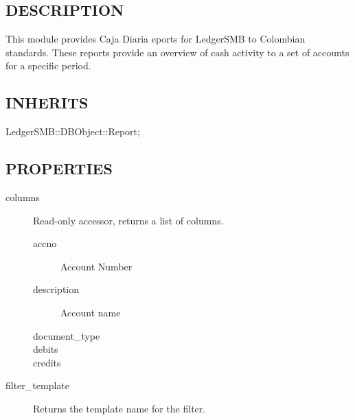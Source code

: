 \begin{description}
\begin{description}
\begin{description}
\begin{description}
\begin{description}
\begin{description}
\begin{description}
\begin{description}
\begin{description}
\begin{description}
\subsection*{DESCRIPTION\label{LedgerSMB::DBObject::Report::co::Caja_Diaria_DESCRIPTION}}


This module provides Caja Diaria eports for LedgerSMB to Colombian standards.
These reports provide an overview of cash activity to a set of accounts for a
specific period.

\subsection*{INHERITS\label{LedgerSMB::DBObject::Report::co::Caja_Diaria_INHERITS}}
\begin{description}

\item[{LedgerSMB::DBObject::Report;}] \mbox{}\end{description}
\subsection*{PROPERTIES\label{LedgerSMB::DBObject::Report::co::Caja_Diaria_PROPERTIES}}
\begin{description}

\item[{columns}] \mbox{}

Read-only accessor, returns a list of columns.

\begin{description}

\item[{accno}] \mbox{}

Account Number


\item[{description}] \mbox{}

Account name


\item[{document\_type}] \mbox{}
\item[{debits}] \mbox{}
\item[{credits}] \mbox{}\end{description}

\item[{filter\_template}] \mbox{}

Returns the template name for the filter.



\end{description}
\end{description}
\end{description}
\end{description}
\end{description}
\end{description}
\end{description}
\end{description}
\end{description}
\end{description}
\end{description}
